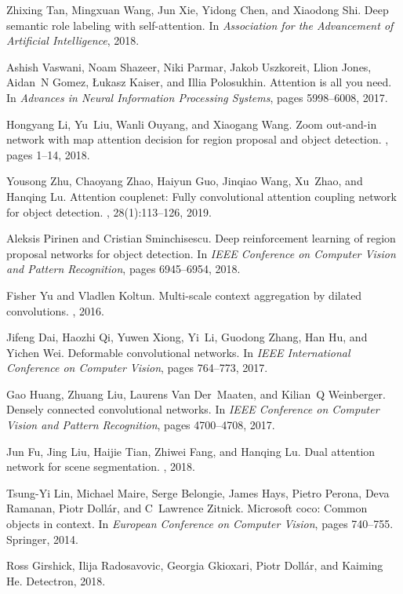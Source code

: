 \documentclass[journal]{IEEEtran}
\begin{document}
\begin{thebibliography}{10}
	Zhixing Tan, Mingxuan Wang, Jun Xie, Yidong Chen, and Xiaodong Shi.
	\newblock Deep semantic role labeling with self-attention.
	\newblock In {\em Association for the Advancement of Artificial Intelligence},
	2018.
	
	Ashish Vaswani, Noam Shazeer, Niki Parmar, Jakob Uszkoreit, Llion Jones,
	Aidan~N Gomez, {\L}ukasz Kaiser, and Illia Polosukhin.
	\newblock Attention is all you need.
	\newblock In {\em Advances in Neural Information Processing Systems}, pages
	5998--6008, 2017.
	
	Hongyang Li, Yu~Liu, Wanli Ouyang, and Xiaogang Wang.
	\newblock Zoom out-and-in network with map attention decision for region
	proposal and object detection.
	, pages 1--14, 2018.
	
	Yousong Zhu, Chaoyang Zhao, Haiyun Guo, Jinqiao Wang, Xu~Zhao, and Hanqing Lu.
	\newblock Attention couplenet: Fully convolutional attention coupling network
	for object detection.
	, 28(1):113--126, 2019.
	
	Aleksis Pirinen and Cristian Sminchisescu.
	\newblock Deep reinforcement learning of region proposal networks for object
	detection.
	\newblock In {\em IEEE Conference on Computer Vision and Pattern Recognition},
	pages 6945--6954, 2018.
	
	Fisher Yu and Vladlen Koltun.
	\newblock Multi-scale context aggregation by dilated convolutions.
	, 2016.
	
	Jifeng Dai, Haozhi Qi, Yuwen Xiong, Yi~Li, Guodong Zhang, Han Hu, and Yichen
	Wei.
	\newblock Deformable convolutional networks.
	\newblock In {\em IEEE International Conference on Computer Vision}, pages
	764--773, 2017.
	
	Gao Huang, Zhuang Liu, Laurens Van Der~Maaten, and Kilian~Q Weinberger.
	\newblock Densely connected convolutional networks.
	\newblock In {\em IEEE Conference on Computer Vision and Pattern Recognition},
	pages 4700--4708, 2017.
	
	Jun Fu, Jing Liu, Haijie Tian, Zhiwei Fang, and Hanqing Lu.
	\newblock Dual attention network for scene segmentation.
	, 2018.
	
	Tsung-Yi Lin, Michael Maire, Serge Belongie, James Hays, Pietro Perona, Deva
	Ramanan, Piotr Doll{\'a}r, and C~Lawrence Zitnick.
	\newblock Microsoft coco: Common objects in context.
	\newblock In {\em European Conference on Computer Vision}, pages 740--755.
	Springer, 2014.
	
	Ross Girshick, Ilija Radosavovic, Georgia Gkioxari, Piotr Doll{\'a}r, and
	Kaiming He.
	\newblock Detectron, 2018.
	
\end{thebibliography}
\end{document}
